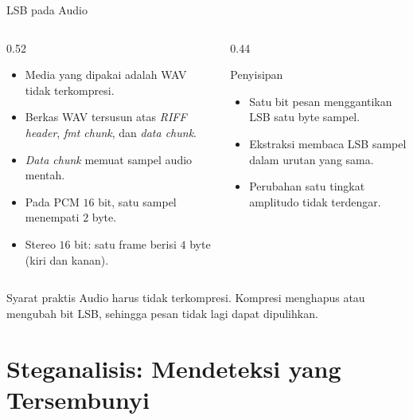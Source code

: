 \documentclass[aspectratio=169,11pt]{beamer}
\begin{document}
\begin{frame}{LSB pada Audio}
    \begin{columns}[T,onlytextwidth]
        \begin{column}{0.52\textwidth}
            \footnotesize
            \begin{itemize}
                \item Media yang dipakai adalah WAV tidak terkompresi.
                \item Berkas WAV tersusun atas \textit{RIFF header},
                      \textit{fmt chunk}, dan \textit{data chunk}.
                \item \textit{Data chunk} memuat sampel audio mentah.
                \item Pada PCM $16$ bit, satu sampel menempati $2$ byte.
                \item Stereo $16$ bit: satu frame berisi $4$ byte
                      (kiri dan kanan).
            \end{itemize}
        \end{column}
        \begin{column}{0.44\textwidth}
            \begin{block}{Penyisipan}
                \footnotesize
                \begin{itemize}
                    \item Satu bit pesan menggantikan LSB satu byte sampel.
                    \item Ekstraksi membaca LSB sampel dalam urutan yang sama.
                    \item Perubahan satu tingkat amplitudo tidak terdengar.
                \end{itemize}
            \end{block}
        \end{column}
    \end{columns}
    \vspace{0.15cm}
    \begin{alertblock}{Syarat praktis}
        \footnotesize
        Audio harus tidak terkompresi. Kompresi menghapus atau mengubah bit
        LSB, sehingga pesan tidak lagi dapat dipulihkan.
    \end{alertblock}
\end{frame}

\section{Steganalisis: Mendeteksi yang Tersembunyi}
\end{document}
